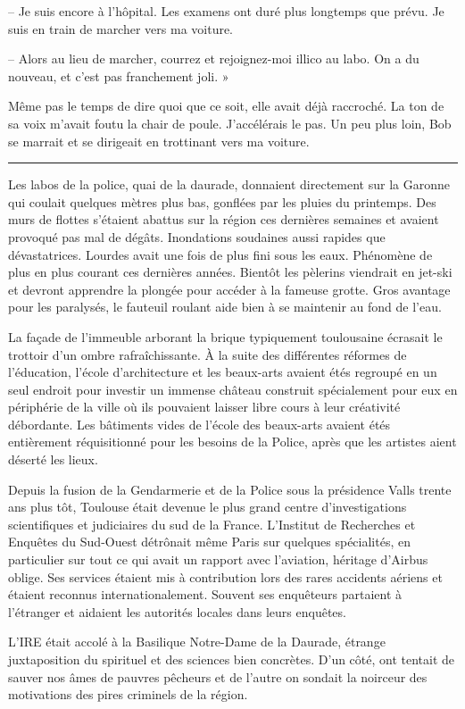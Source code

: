 -- Je suis encore à l'hôpital. Les examens ont duré plus longtemps que prévu. Je suis en train de marcher vers ma 
voiture.

-- Alors au lieu de marcher, courrez et rejoignez-moi illico au labo. On a du nouveau, et c'est pas franchement joli. »

Même pas le temps de dire quoi que ce soit, elle avait déjà raccroché. La ton de sa voix m'avait foutu la chair de 
poule. J'accélérais le pas. Un peu plus loin, Bob se marrait et se dirigeait en trottinant vers ma voiture.\linebreak 

\fancybreak{ * * * }

Les labos de la police, quai de la daurade, donnaient directement sur la Garonne qui coulait quelques mètres plus bas, 
gonflées par les pluies du printemps. Des murs de flottes s'étaient abattus sur la région ces dernières semaines et 
avaient provoqué pas mal de dégâts. Inondations soudaines aussi rapides que dévastatrices. Lourdes avait une fois de 
plus fini sous les eaux. Phénomène de plus en plus courant ces dernières années. Bientôt les pèlerins viendrait en 
jet-ski et devront apprendre la plongée pour accéder à la fameuse grotte. Gros avantage pour les paralysés, le fauteuil 
roulant aide bien à se maintenir au fond de l'eau.

La façade de l'immeuble arborant la brique typiquement toulousaine écrasait le trottoir d'un ombre rafraîchissante. À 
la suite des différentes réformes de l'éducation, l'école d'architecture et les beaux-arts avaient étés regroupé en un 
seul endroit pour investir un immense château construit spécialement pour eux en périphérie de la ville où ils pouvaient 
laisser libre cours à leur créativité débordante. Les bâtiments vides de l'école des beaux-arts avaient étés entièrement 
réquisitionné pour les besoins de la Police, après que les artistes aient déserté les lieux.

Depuis la fusion de la Gendarmerie et de la Police sous la présidence Valls trente ans plus tôt, Toulouse était devenue 
le plus grand centre d'investigations scientifiques et judiciaires du sud de la France. L'Institut de Recherches et 
Enquêtes du Sud-Ouest détrônait même Paris sur quelques spécialités, en particulier sur tout ce qui avait un rapport 
avec l'aviation, héritage d'Airbus oblige. Ses services étaient mis à contribution lors des rares accidents aériens et 
étaient reconnus internationalement. Souvent ses enquêteurs partaient à l'étranger et aidaient les autorités locales 
dans leurs enquêtes.

L'IRE était accolé à la Basilique Notre-Dame de la Daurade, étrange juxtaposition du spirituel et des sciences bien 
concrètes. D'un côté, ont tentait de sauver nos âmes de pauvres pêcheurs et de l'autre on sondait la noirceur des 
motivations des pires criminels de la région.